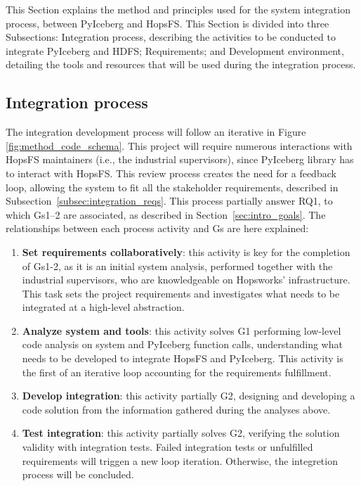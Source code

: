 This Section explains the method and principles used for the system integration process, between PyIceberg and \gls{HopsFS}. This Section is divided into three Subsections: Integration process, describing the activities to be conducted to integrate PyIceberg and \gls{HDFS}; Requirements; and Development environment, detailing the tools and resources that will be used during the integration process.


\subsection{Integration process}
\label{subsec:integration_process}
The integration development process will follow an iterative in Figure \ref{fig:method_code_schema}. This project will require numerous interactions with \gls{HopsFS} maintainers (i.e., the industrial supervisors), since PyIceberg library has to interact with \gls{HopsFS}. This review process creates the need for a feedback loop, allowing the system to fit all the stakeholder requirements, described in Subsection~\ref{subsec:integration_reqs}. This process partially answer \gls{RQ}1, to which \glspl{G}1--2 are associated, as described in Section~\ref{sec:intro_goals}. The relationships between each process activity and \glspl{G} are here explained:

\begin{enumerate}
    \item \textbf{Set requirements collaboratively}: this activity is key for the completion of \glspl{G}1-2, as it is an initial system analysis, performed together with the industrial supervisors, who are knowledgeable on Hopsworks' infrastructure. This task sets the project requirements and investigates what needs to be integrated at a high-level abstraction.
    \item \textbf{Analyze system and tools}: this activity solves \gls{G}1 performing low-level code analysis on system and PyIceberg function calls, understanding what needs to be developed to integrate \gls{HopsFS} and PyIceberg. This activity is the first of an iterative loop accounting for the requirements fulfillment.
    \item \textbf{Develop integration}: this activity partially \gls{G}2, designing and developing a code solution from the information gathered during the analyses above.
    \item \textbf{Test integration}: this activity partially solves \gls{G}2, verifying the solution validity with integration tests. Failed integration tests or unfulfilled requirements will triggen a new loop iteration. Otherwise, the integretion process will be concluded.
\end{enumerate}

